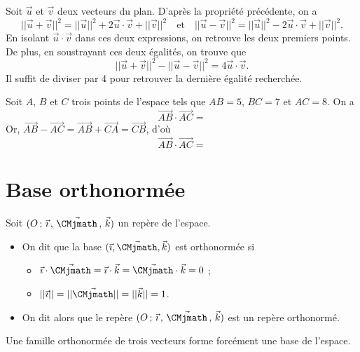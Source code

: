 \documentclass[11pt,fleqn, openany]{book} %
\begin{document}
\begin{demonstration} Soit $\vec{u}$ et $\vec{v}$ deux vecteurs du plan. D'après la propriété précédente, on a 
\[\lvert\lvert\vec{u}+\vec{v}\rvert\rvert^2=\lvert\lvert\vec{u}\rvert\rvert^2+2\vec{u}\cdot\vec{v}+\lvert\lvert\vec{v}\rvert\rvert^2\quad\text{et}\quad \lvert\lvert\vec{u}-\vec{v}\rvert\rvert^2=\lvert\lvert\vec{u}\rvert\rvert^2-2\vec{u}\cdot\vec{v}+\lvert\lvert\vec{v}\rvert\rvert^2.\]
En isolant $\vec{u}\cdot \vec{v}$ dans ces deux expressions, on retrouve les deux premiers points. De plus, en soustrayant ces deux égalités, on trouve que
\[\lvert\lvert\vec{u}+\vec{v}\rvert\rvert^2-\lvert\lvert\vec{u}-\vec{v}\rvert\rvert^2=4\vec{u}\cdot\vec{v}.\]
Il suffit de diviser par 4 pour retrouver la dernière égalité recherchée.\end{demonstration}

\begin{example}Soit $A$, $B$ et $C$ trois points de l'espace tels que $AB=5$, $BC=7$ et $AC=8$. On a
\[\overrightarrow{AB}\cdot \overrightarrow{AC}=\]
Or, $\overrightarrow{AB}-\overrightarrow{AC}=\overrightarrow{AB}+\overrightarrow{CA}=\overrightarrow{CB}$, d'où
\[\overrightarrow{AB}\cdot \overrightarrow{AC}=\]\vspace{-0.5cm}\end{example}


\section{Base orthonormée}

\begin{definition}Soit $\Oijk$ un repère de l'espace.
\begin{itemize}
\item On dit que la base $(\vec{\imath}, \vec{\CMjmath}, \vec k)$ est orthonormée si
\begin{itemize}
\item $\vec{\imath} \cdot \vec{\CMjmath} = \vec{\imath} \cdot \vec k = \vec{\CMjmath} \cdot \vec k = 0$ ;
\item $\lvert\lvert\vec{\imath}\rvert\rvert=\lvert\lvert\vec{\CMjmath}\rvert\rvert=\lvert\lvert\vec k\rvert\rvert = 1$.
\end{itemize}
\item On dit alors que le repère $\Oijk$ est un repère orthonormé.
\end{itemize}\end{definition}

Une famille orthonormée de trois vecteurs forme forcément une base de l'espace.
\end{document}
